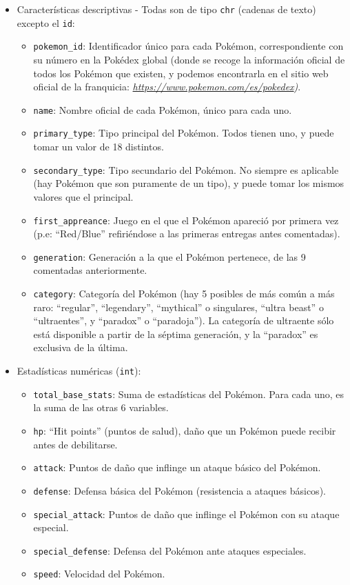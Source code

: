 \documentclass[
  12pt,
]{extreport}
\begin{document}
\begin{itemize}
\item
  Características descriptivas - Todas son de tipo \texttt{chr} (cadenas
  de texto) excepto el \texttt{id}:

  \begin{itemize}
  \item
    \texttt{pokemon\_id}: Identificador único para cada Pokémon,
    correspondiente con su número en la Pokédex global (donde se recoge
    la información oficial de todos los Pokémon que existen, y podemos
    encontrarla en el sitio web oficial de la franquicia:
    \href{https://www.pokemon.com/es/pokedex}{\emph{https://www.pokemon.com/es/pokedex}}\emph{)}.
  \item
    \texttt{name}: Nombre oficial de cada Pokémon, único para cada uno.
  \item
    \texttt{primary\_type}: Tipo principal del Pokémon. Todos tienen
    uno, y puede tomar un valor de 18 distintos.
  \item
    \texttt{secondary\_type}: Tipo secundario del Pokémon. No siempre es
    aplicable (hay Pokémon que son puramente de un tipo), y puede tomar
    los mismos valores que el principal.
  \item
    \texttt{first\_appreance}: Juego en el que el Pokémon apareció por
    primera vez (p.e: ``Red/Blue'' refiriéndose a las primeras entregas
    antes comentadas).
  \item
    \texttt{generation}: Generación a la que el Pokémon pertenece, de
    las 9 comentadas anteriormente.
  \item
    \texttt{category}: Categoría del Pokémon (hay 5 posibles de más
    común a más raro: ``regular'', ``legendary'', ``mythical'' o
    singulares, ``ultra beast'' o ``ultraentes'', y ``paradox'' o
    ``paradoja''). La categoría de ultraente sólo está disponible a
    partir de la séptima generación, y la ``paradox'' es exclusiva de la
    última.
  \end{itemize}
\item
  Estadísticas numéricas (\texttt{int}):

  \begin{itemize}
  \item
    \texttt{total\_base\_stats}: Suma de estadísticas del Pokémon. Para
    cada uno, es la suma de las otras 6 variables.
  \item
    \texttt{hp}: ``Hit points'' (puntos de salud), daño que un Pokémon
    puede recibir antes de debilitarse.
  \item
    \texttt{attack}: Puntos de daño que inflinge un ataque básico del
    Pokémon.
  \item
    \texttt{defense}: Defensa básica del Pokémon (resistencia a ataques
    básicos).
  \item
    \texttt{special\_attack}: Puntos de daño que inflinge el Pokémon con
    su ataque especial.
  \item
    \texttt{special\_defense}: Defensa del Pokémon ante ataques
    especiales.
  \item
    \texttt{speed}: Velocidad del Pokémon.
  \end{itemize}
\end{itemize}
\end{document}
